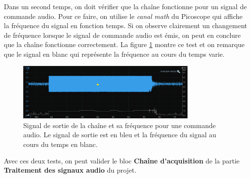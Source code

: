 Dans un second temps, on doit vérifier que la chaîne fonctionne pour un signal de commande audio. Pour ce faire, on utilise le \textit{canal math} du Picoscope qui affiche la fréquence du signal en fonction temps. Si on observe clairement un changement de fréquence lorsque le signal de commande audio est émis, on peut en conclure que la chaîne fonctionne correctement. La figure \ref{fig:testacqui} montre ce test et on remarque que le signal en blanc qui représente la fréquence au cours du temps varie.

\begin{figure}[H]
    \centering
    \includegraphics[width=0.8\textwidth]{Pictures/testchaineacqui.png}
    \caption{Signal de sortie de la chaîne et sa fréquence pour une commande audio. Le signal de sortie est en bleu et la fréquence du signal au cours du temps en blanc.}
    \label{fig:testacqui}
\end{figure}

Avec ces deux tests, on peut valider le bloc \textbf{Chaîne d'acquisition} de la partie \textbf{Traitement des signaux audio} du projet. %